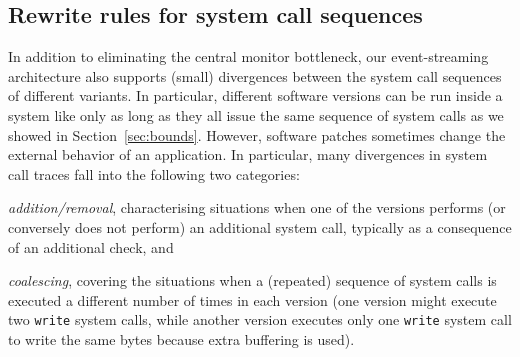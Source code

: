 



\subsection{Rewrite rules for system call sequences}
\label{sec:rw}

In addition to eliminating the central monitor bottleneck, our
event-streaming architecture also supports (small) divergences between
the system call sequences of different variants.  In particular,
different software versions can be run inside a
system like \mx only as long as they all issue the same sequence of system
calls as we showed in Section~\ref{sec:bounds}. However, software patches sometimes change the
external behavior of an application.  In particular, many divergences
in system call traces fall into the following two categories:
\begin{inparaenum}[(i)]
\item \emph{addition/removal}, characterising situations when one of
  the versions performs (or conversely does not perform) an additional
  system call, typically as a consequence of an additional check, and
\item \emph{coalescing}, covering the situations when a (repeated)
  sequence of system calls is executed a different number of times in
  each version (\eg one version might execute two \lstinline`write`
  system calls, while another version executes only one
  \lstinline`write` system call to write the same bytes because extra
  buffering is used).

\end{inparaenum}

